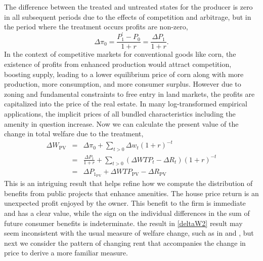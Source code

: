 \documentclass[ecta,nameyear,draft]{econsocart}
\theoremstyle{plain}
\theoremstyle{remark}
\begin{document}
The difference between the treated and untreated states for the producer is zero in all subsequent periods due to the effects of competition and arbitrage, but in the period where the treatment occurs profits are non-zero,
\begin{equation}
	\Delta\pi_0=\frac{P^\prime_1-P_0}{1+r}=\frac{\Delta P_1}{1+r}.\label{pitzero}
\end{equation}
In the context of competitive markets for conventional goods like corn, the existence of profits from enhanced production would attract competition, boosting supply, leading to a lower equilibrium price of corn along with more production, more consumption, and more consumer surplus. However due to zoning and fundamental constraints to free entry in land markets, the profits are capitalized into the price of the real estate. In many log-transformed empirical applications, the implicit prices of all bundled characteristics including the amenity in question increase.
Now we can calculate the present value of the change in total welfare due to the treatment,
\begin{eqnarray}
	\Delta W_{\mathrm{PV}}&=&\Delta \pi_0+\sum_{t>0}\Delta w_t(1+r)^{-t}\nonumber\\
	&=&\frac{\Delta P_1}{1+r}+\sum_{t>0} (\Delta \mathit{WTP}_t-\Delta R_t)(1+r)^{-t} \label{deltaW1}\\
	&=&\Delta P_{1_{\mathrm{PV}}}+\Delta\mathit{WTP}_\mathrm{PV}-\Delta R_{\mathrm{PV}}\label{deltaW2}
\end{eqnarray}
This is an intriguing result that helps refine how we compute the distribution of benefits from public projects that enhance amenities. The house price return is an unexpected profit enjoyed by the owner. This benefit to the firm is immediate and has a clear value, while the sign on the individual differences in the sum of future consumer benefits is indeterminate. the result in \ref{deltaW2} result may seem inconsistent with the usual measure of welfare change, such as in \cite{freeman14} and \cite{banzhaf20}, but next we consider the pattern of changing rent that accompanies the change in price to derive a more familiar measure. 
\end{document}
